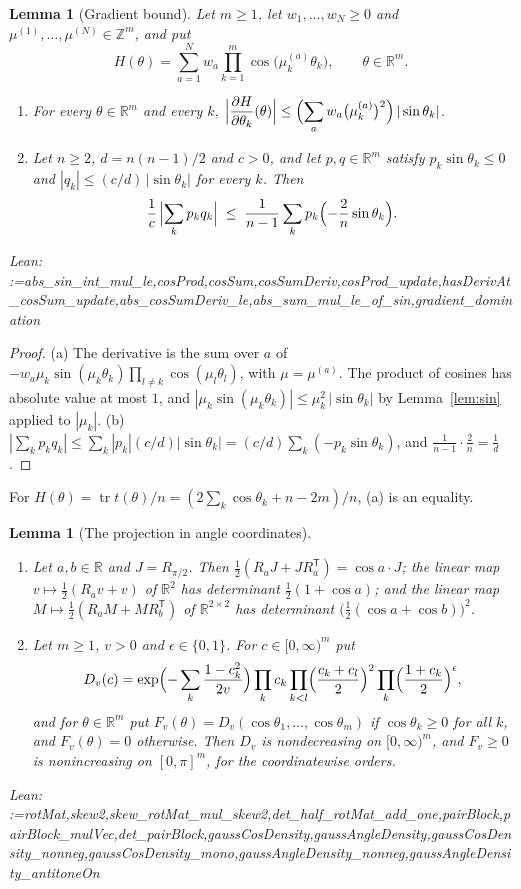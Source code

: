 \documentclass[11pt]{amsart}
\makeatletter
\newtheorem{lemma}[theorem]{Lemma}
\theoremstyle{definition}
\theoremstyle{remark}
\newcommand{\@leanlist}[1]{\def\@leansep{}\@for\@leanname:=#1\do{\@leansep
  \texttt{\expandafter\detokenize\expandafter{\@leanname}}\def\@leansep{, }}}
\newcommand{\lean}[1]{\par\smallskip\noindent
  {\footnotesize\normalfont\raggedright\textsf{Lean:} \@leanlist{#1}\par}}
\newcommand{\R}{\mathbb{R}}
\newcommand{\Z}{\mathbb{Z}}
\newcommand{\tr}{\operatorname{tr}}
\newcommand{\transp}{^{\mathsf T}}
\makeatother
\begin{document}
\begin{lemma}[Gradient bound]\label{lem:grad}
Let $m\ge1$, let $w_1,\dots,w_N\ge0$ and $\mu^{(1)},\dots,\mu^{(N)}\in\Z^m$, and put
\[
  H(\theta)=\sum_{a=1}^Nw_a\prod_{k=1}^m\cos\bigl(\mu^{(a)}_k\theta_k\bigr),\qquad\theta\in\R^m .
\]
\begin{enumerate}
\item[(a)] For every $\theta\in\R^m$ and every $k$,
$\displaystyle\Bigl|\frac{\partial H}{\partial\theta_k}(\theta)\Bigr|\le
\Bigl(\sum_aw_a\bigl(\mu^{(a)}_k\bigr)^2\Bigr)\,|\sin\theta_k|$.
\item[(b)] Let $n\ge2$, $d=n(n-1)/2$ and $c>0$, and let $p,q\in\R^m$ satisfy
$p_k\sin\theta_k\le0$ and $|q_k|\le(c/d)\,|\sin\theta_k|$ for every $k$.  Then
\[
  \frac1c\,\Bigl|\sum_kp_kq_k\Bigr|\;\le\;\frac1{n-1}\sum_kp_k\Bigl(-\frac2n\sin\theta_k\Bigr).
\]
\end{enumerate}
\lean{abs_sin_int_mul_le,cosProd,cosSum,cosSumDeriv,cosProd_update,hasDerivAt_cosSum_update,abs_cosSumDeriv_le,abs_sum_mul_le_of_sin,gradient_domination}
\end{lemma}

\begin{proof}
(a) The derivative is the sum over $a$ of
$-w_a\mu_k\sin(\mu_k\theta_k)\prod_{l\ne k}\cos(\mu_l\theta_l)$, with $\mu=\mu^{(a)}$.  The product
of cosines has absolute value at most $1$, and
$|\mu_k\sin(\mu_k\theta_k)|\le\mu_k^2\,|\sin\theta_k|$ by Lemma~\ref{lem:sin} applied to
$|\mu_k|$.  (b) $|\sum_kp_kq_k|\le\sum_k|p_k|(c/d)|\sin\theta_k|=(c/d)\sum_k(-p_k\sin\theta_k)$,
and $\frac1{n-1}\cdot\frac2n=\frac1d$.
\end{proof}

For $H(\theta)=\tr t(\theta)/n=(2\sum_k\cos\theta_k+n-2m)/n$, (a) is an equality.

\begin{lemma}[The projection in angle coordinates]\label{lem:jacobian}
\begin{enumerate}
\item[(a)] Let $a,b\in\R$ and $J=R_{\pi/2}$.  Then $\frac12(R_aJ+JR_a\transp)=\cos a\cdot J$; the
linear map $v\mapsto\frac12(R_av+v)$ of $\R^2$ has determinant $\frac12(1+\cos a)$; and the linear
map $M\mapsto\frac12(R_aM+MR_b\transp)$ of $\R^{2\times2}$ has determinant
$\bigl(\frac12(\cos a+\cos b)\bigr)^2$.
\item[(b)] Let $m\ge1$, $v>0$ and $\epsilon\in\{0,1\}$.  For $c\in[0,\infty)^m$ put
\[
  D_v(c)=\exp\Bigl(-\sum_k\frac{1-c_k^2}{2v}\Bigr)\prod_kc_k\prod_{k<l}\Bigl(\frac{c_k+c_l}2\Bigr)^2
  \prod_k\Bigl(\frac{1+c_k}2\Bigr)^{\epsilon},
\]
and for $\theta\in\R^m$ put $F_v(\theta)=D_v(\cos\theta_1,\dots,\cos\theta_m)$ if $\cos\theta_k\ge0$
for all $k$, and $F_v(\theta)=0$ otherwise.  Then $D_v$ is nondecreasing on $[0,\infty)^m$, and
$F_v\ge0$ is nonincreasing on $[0,\pi]^m$, for the coordinatewise orders.
\end{enumerate}
\lean{rotMat,skew2,skew_rotMat_mul_skew2,det_half_rotMat_add_one,pairBlock,pairBlock_mulVec,det_pairBlock,gaussCosDensity,gaussAngleDensity,gaussCosDensity_nonneg,gaussCosDensity_mono,gaussAngleDensity_nonneg,gaussAngleDensity_antitoneOn}
\end{lemma}
\end{document}
